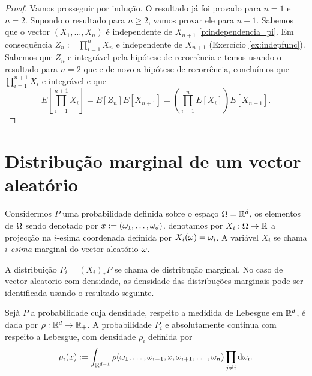   \begin{proof}
   Vamos prosseguir por indução. O resultado já foi provado para $n=1$ e $n=2$.
Supondo o resultado para $n\ge 2$, vamos provar ele para $n+1$.
Sabemos que o vector $(X_1,\dots,X_n)$ é independente de $X_{n+1}$ \cref{p:independencia_pi}. Em consequência $Z_n:=\prod_{i=1}^n X_n$
e independente de $X_{n+1}$ (Exercício \ref{ex:indepfunc}). Sabemos que $Z_n$ e integrável pela hipótese de recorrência e temos
usando o resultado para $n=2$ que e de novo a hipótese de recorrência, concluímos que $\prod_{i=1}^{n+1} X_i$ e integrável e que
\begin{equation}
 E[\prod_{i=1}^{n+1} X_i]=E[Z_n]E[X_{n+1}]=\left(\prod_{i=1}^n E[X_i]\right) E[X_{n+1}].
\end{equation}
\end{proof}


\section{Distribução marginal de um vector aleatório}

Considermos $P$ uma probabilidade definida sobre o espaço $\Omega={\mathbb R}^d$, os elementos de $\Omega$ sendo denotado por $x:=(\omega_1,\dots,\omega_d)$.
denotamos por $X_i : \Omega \to {\ensuremath{\mathbb R}}$ a projecção na $i$-esima coordenada definida por $X_i(\omega)=\omega_i$.
A variável $X_i$ se chama \emph{$i$-esima} marginal do vector aleatório $\omega$. 

\medskip

A distribuição $P_i=(X_i)_*P$ se chama de distribução marginal.
No caso de vector aleatorio com densidade, as densidade das distribuções marginais pode ser identificada usando o resultado seguinte.

\begin{proposition}
 Sejà $P$ a probabilidade cuja densidade, respeito a medidida de Lebesgue em ${\mathbb R}^d$, é dada por $\rho: {\mathbb R}^d \to {\ensuremath{\mathbb R}}_+$.
 A probabilidade $P_i$ e absolutamente continua com respeito a Lebesgue, com densidade $\rho_i$ definida por
 \begin{equation*}
  \rho_i(x):= \int_{{\mathbb R}^{d-1}}\rho(\omega_1,\dots ,\omega_{i-1},x,\omega_{i+1},\dots,\omega_n)\prod_{j\ne i} \mathrm{d} \omega_i.
 \end{equation*}



\end{proposition}

